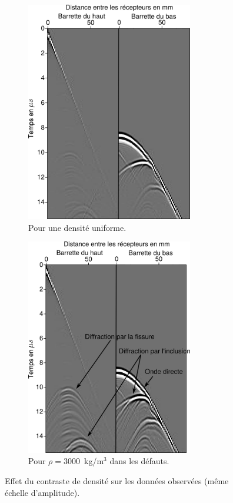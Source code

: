 \begin{figure}[!h]
	\centering
	\begin{subfigure}[b]{0.45\textwidth}
		\centering
		\includegraphics[width=0.8\textwidth]{img/rho_sur_donnees/data_rho_uni.png}
		\caption{Pour une densité uniforme.}
	\end{subfigure}
		\begin{subfigure}[b]{0.45\textwidth}
		\centering
		\includegraphics[width=0.8\textwidth]{img/rho_sur_donnees/data_rho_vrai.png}
		\caption{Pour $\rho=3000$~kg/m$^{3}$ dans les défauts.}
	\end{subfigure}
	\caption{Effet du contraste de densité sur les données observées (même échelle d'amplitude).\label{app:traces_rho}}	
\end{figure}

